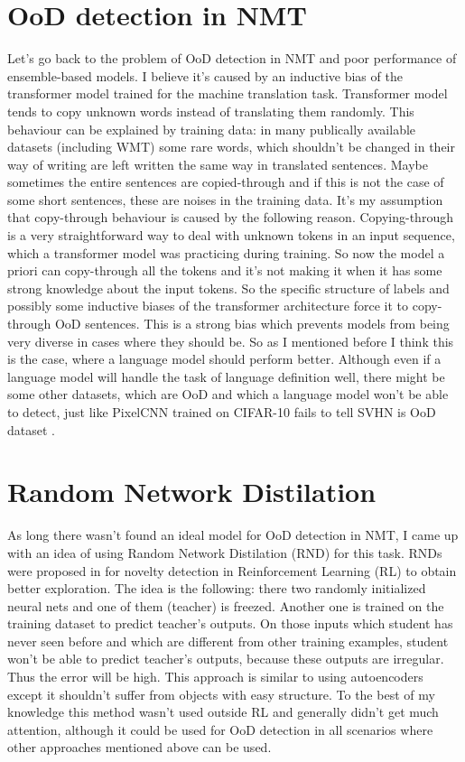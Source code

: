 \documentclass{article}
\begin{document}
\section{OoD detection in NMT}
    Let's go back to the problem of OoD detection in NMT and poor performance of ensemble-based models. I believe it's caused by an inductive bias of the transformer model \cite{transformer} trained for the machine translation task. Transformer model tends to copy unknown words instead of translating them randomly. This behaviour can be explained by training data: in many publically available datasets (including WMT) some rare words, which shouldn't be changed in their way of writing are left written the same way in translated sentences. Maybe sometimes the entire sentences are copied-through and if this is not the case of some short sentences, these are noises in the training data. It's my assumption that copy-through behaviour is caused by the following reason. Copying-through is a very straightforward way to deal with unknown tokens in an input sequence, which a transformer model was practicing during training. So now the model a priori can copy-through all the tokens and it's not making it when it has some strong knowledge about the input tokens. So the specific structure of labels and possibly some inductive biases of the transformer architecture force it to copy-through OoD sentences. This is a strong bias which prevents models from being very diverse in cases where they should be. So as I mentioned before I think this is the case, where a language model should perform better. Although even if a language model will handle the task of language definition well, there might be some other datasets, which are OoD and which a language model won't be able to detect, just like PixelCNN trained on CIFAR-10 fails to tell SVHN is OoD dataset \cite{do_dont_know}.

\section{Random Network Distilation}
    As long there wasn't found an ideal model for OoD detection in NMT, I came up with an idea of using Random Network Distilation (RND) for this task. RNDs were proposed in \cite{random_network} for novelty detection in Reinforcement Learning (RL) to obtain better exploration. The idea is the following: there two randomly initialized neural nets and one of them (teacher) is freezed. Another one is trained on the training dataset to predict teacher's outputs. On those inputs which student has never seen before and which are different from other training examples, student won't be able to predict teacher's outputs, because these outputs are irregular. Thus the error will be high. This approach is similar to using autoencoders except it shouldn't suffer from objects with easy structure. To the best of my knowledge this method wasn't used outside RL and generally didn't get much attention, although it could be used for OoD detection in all scenarios where other approaches mentioned above can be used.
\end{document}
